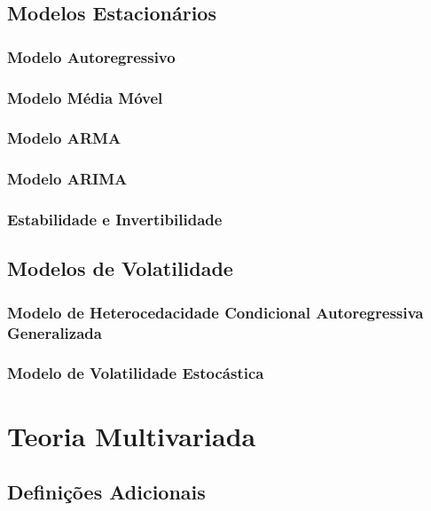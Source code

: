\section{Modelos Estacionários}

\subsection{Modelo Autoregressivo}
\label{ssec:AR(p)}

\subsection{Modelo Média Móvel}
\label{ssec:MA(p)}

\subsection{Modelo ARMA}
\label{ssec:ARMA}

\subsection{Modelo ARIMA}
\label{ssec:ARIMA}

\subsection{Estabilidade e Invertibilidade}
\label{ssec:stability_invertibility}

\section{Modelos de Volatilidade}
\label{sec:volatility_models}

\subsection{Modelo de Heterocedacidade Condicional Autoregressiva Generalizada}
\label{sec:garch}

\subsection{Modelo de Volatilidade Estocástica}

\chapter{Teoria Multivariada}

\section{Definições Adicionais}

